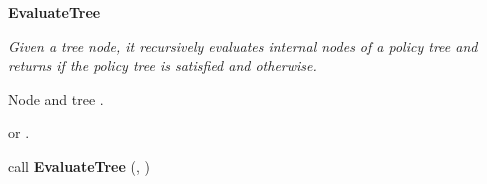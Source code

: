 \documentclass[epsfig,a4paper,11pt,titlepage]{book}
\numberwithin{algorithm}{chapter}
\newcommand{\algofontsize}{\fontsize{11}{12}\selectfont}
\begin{document}
\begin{algorithm} [htp]

{\algofontsize
\caption{\textbf{EvaluateTree}}

\label{algo:erbac-evaluate-tree}

\begin{algorithmic}[1]

\INPUT \emph{Given a tree node, it recursively evaluates internal nodes of a policy tree and returns  if the policy tree is satisfied and  otherwise.}

\Require Node  and tree .

\Ensure  or .

\medskip

\If {} \label{line:erbac-evaluate-tree-if-null}

	\Return  \label{line:erbac-evaluate-tree-decision-not-null}
	
\EndIf

 \label{line:erbac-evaluate-tree-child-loop}
	
	\State call \textbf{EvaluateTree} (, ) {\algofontsize {}} \label{line:erbac-evaluate-tree-call}
	
\EndFor

\State  \label{line:erbac-evaluate-tree-init-t}

\State  \label{line:erbac-evaluate-tree-init-m}

 \label{line:erbac-evaluate-tree-count-loop}

	\State  \label{line:erbac-evaluate-tree-inc-t}
	
	\If {} \label{line:erbac-evaluate-tree-find-decision}
	
		\State  \label{line:erbac-evaluate-tree-inc-m}
		
	\EndIf

\EndFor

 \label{line:erbac-evaluate-tree-find-gate}

	\State  \label{line:erbac-evaluate-tree-set-decision-true}
	
\Else

	\State  \label{line:erbac-evaluate-tree-set-decision-false}
	
\EndIf

\Return  \label{line:erbac-evaluate-tree-return-decision}

\end{algorithmic}

}

\end{algorithm}
\end{document}
